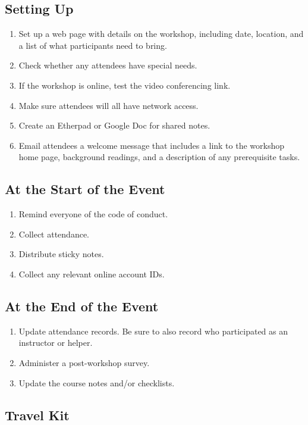 \subsection{Setting Up}

\begin{enumerate}
\item
  Set up a web page with details on the workshop, including date,
  location, and a list of what participants need to bring.
\item
  Check whether any attendees have special needs.
\item
  If the workshop is online, test the video conferencing link.
\item
  Make sure attendees will all have network access.
\item
  Create an Etherpad or Google Doc for shared notes.
\item
  Email attendees a welcome message that includes a link to the
  workshop home page, background readings, and a description of any
  prerequisite tasks.
\end{enumerate}

\subsection{At the Start of the Event}

\begin{enumerate}
\item
  Remind everyone of the code of conduct.
\item
  Collect attendance.
\item
  Distribute sticky notes.
\item
  Collect any relevant online account IDs.
\end{enumerate}

\subsection{At the End of the Event}

\begin{enumerate}
\item
  Update attendance records. Be sure to also record who participated
  as an instructor or helper.
\item
  Administer a post-workshop survey.
\item
  Update the course notes and/or checklists.
\end{enumerate}

\subsection{Travel Kit}

